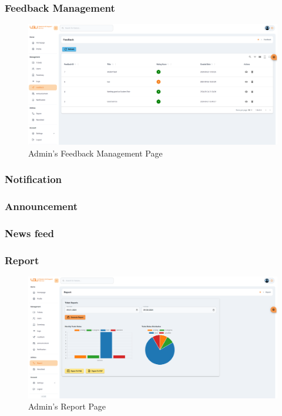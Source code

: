 	
	\subsubsection{Feedback Management}
	\begin{figure}[H]
		\centering
		\includegraphics[width=1\linewidth]{graphics/gui/admin/feedback-mng}
		\caption{Admin's Feedback Management Page}
		\label{fig:feedback-mng}
	\end{figure}
	
	\subsubsection{Notification}
	
	\subsubsection{Announcement}
	
	\subsubsection{News feed}
	
	
	\subsubsection{Report}
	\begin{figure}[H]
		\centering
		\includegraphics[width=1\linewidth]{graphics/gui/admin/report-util}
		\caption{Admin's Report Page}
		\label{fig:report-util}
	\end{figure}
	
